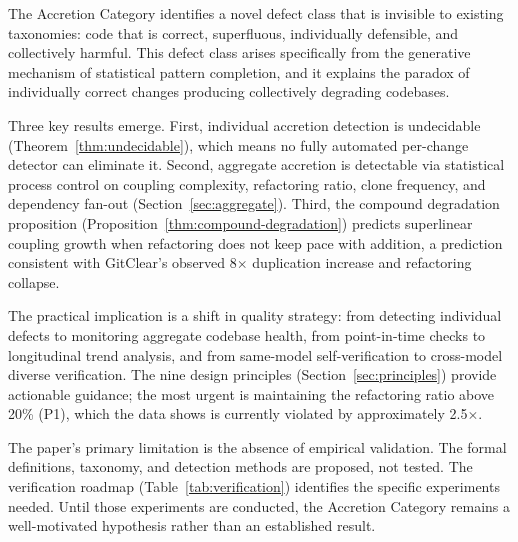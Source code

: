 \documentclass[11pt, a4paper, copyright]{googledeepmind}
\begin{document}
The Accretion Category identifies a novel defect class that is invisible to existing taxonomies: code that is correct, superfluous, individually defensible, and collectively harmful. This defect class arises specifically from the generative mechanism of statistical pattern completion, and it explains the paradox of individually correct changes producing collectively degrading codebases.

Three key results emerge. First, individual accretion detection is undecidable (Theorem~\ref{thm:undecidable}), which means no fully automated per-change detector can eliminate it. Second, aggregate accretion is detectable via statistical process control on coupling complexity, refactoring ratio, clone frequency, and dependency fan-out (Section~\ref{sec:aggregate}). Third, the compound degradation proposition (Proposition~\ref{thm:compound-degradation}) predicts superlinear coupling growth when refactoring does not keep pace with addition, a prediction consistent with GitClear's observed 8$\times$ duplication increase and refactoring collapse.

The practical implication is a shift in quality strategy: from detecting individual defects to monitoring aggregate codebase health, from point-in-time checks to longitudinal trend analysis, and from same-model self-verification to cross-model diverse verification. The nine design principles (Section~\ref{sec:principles}) provide actionable guidance; the most urgent is maintaining the refactoring ratio above 20\% (P1), which the data shows is currently violated by approximately 2.5$\times$.

The paper's primary limitation is the absence of empirical validation. The formal definitions, taxonomy, and detection methods are proposed, not tested. The verification roadmap (Table~\ref{tab:verification}) identifies the specific experiments needed. Until those experiments are conducted, the Accretion Category remains a well-motivated hypothesis rather than an established result.


\end{document}
